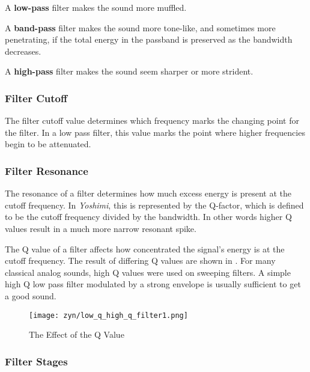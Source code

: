    \begin{enumber}
      \item A \textbf{low-pass} filter makes the sound more muffled.
      \item A \textbf{band-pass} filter makes the sound more tone-like, and
         sometimes more penetrating, if the total energy in the passband is
         preserved as the bandwidth decreases.
      \item A \textbf{high-pass} filter makes the sound seem sharper or more
         strident.
   \end{enumber}

\subsubsection{Filter Cutoff}
\label{subsubsec:filter_cutoff}

   The filter cutoff value determines which frequency marks the changing
   point for the filter. In a low pass filter, this value marks the point
   where higher frequencies begin to be attenuated.

\subsubsection{Filter Resonance}
\label{subsubsec:filter_resonance}

   The resonance of a filter determines how much excess energy is present at
   the cutoff frequency. In \textsl{Yoshimi},
   this is represented by the Q-factor,
   which is defined to be the cutoff frequency divided by the bandwidth. In
   other words higher Q values result in a much more narrow resonant spike.

   The Q value of a filter affects how concentrated
   the signal’s energy is at the cutoff frequency. The result of differing Q
   values are shown in .
   For many classical analog sounds, high Q values were used on sweeping
   filters. A simple high Q low pass filter modulated by a strong envelope is
   usually sufficient to get a good sound.

\begin{figure}[H]
   \centering
   \texttt{[image: zyn/low\_q\_high\_q\_filter1.png]}
   \caption[Low Q vs. High Q]{The Effect of the Q Value}
   \label{fig:low_q_vs_high_q}
\end{figure}

\subsubsection{Filter Stages}
\label{subsubsec:filter_stages}

